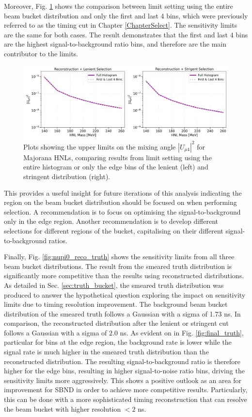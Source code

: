 Moreover, Fig. \ref{fig:nupi0_reco_full_edge} shows the comparison between limit setting using the entire beam bucket distribution and only the first and last 4 bins, which were previously referred to as the timing cut in Chapter \ref{ChapterSelect}. 
The sensitivity limits are the same for both cases.
The result demonstrates that the first and last 4 bins are the highest signal-to-background ratio bins, and therefore are the main contributor to the limits.
\begin{figure}[bp!]
    \centering
    \includegraphics[width=\textwidth]{sensitivity_full_edge}
    \caption{Plots showing the upper limits on the mixing angle $|U_{\mu4}|^2$ for Majorana HNLs, comparing results from limit setting using the entire histogram or only the edge bins of the lenient (left) and stringent distribution (right).}
    \label{fig:nupi0_reco_full_edge}
\end{figure}
This provides a useful insight for future iterations of this analysis indicating the region on the beam bucket distribution should be focused on when performing selection.
A recommendation is to focus on optimising the signal-to-background only in the edge region.
Another recommendation is to develop different selections for different regions of the bucket, capitalising on their different signal-to-background ratios.

Finally, Fig. \ref{fig:nupi0_reco_truth} shows the sensitivity limits from all three beam bucket distributions.
The result from the smeared truth distribution is significantly more competitive than the results using reconstructed distributions.
As detailed in Sec. \ref{sec:truth_bucket}, the smeared truth distribution was produced to answer the hypothetical question exploring the impact on sensitivity limits due to timing resolution improvement. 
The background beam bucket distribution of the smeared truth follows a Gaussian with a sigma of 1.73 ns.
In comparison, the reconstructed distribution after the lenient or stringent cut follows a Gaussian with a sigma of $2.0$ ns.
As evident on in Fig. \ref{fig:final_truth}, particular for bins at the edge region, the background rate is lower while the signal rate is much higher in the smeared truth distribution than the reconstructed distribution.
The resulting signal-to-background ratio is therefore higher for the edge bins, resulting in higher signal-to-noise ratio bins, driving the sensitivity limits more aggressively. 
This shows a positive outlook as an area for improvement for SBND in order to achieve more competitive results.
Particularly, this can be done with a more sophisticated timing reconstruction that can resolve the beam bucket with higher resolution $< 2$ ns.

